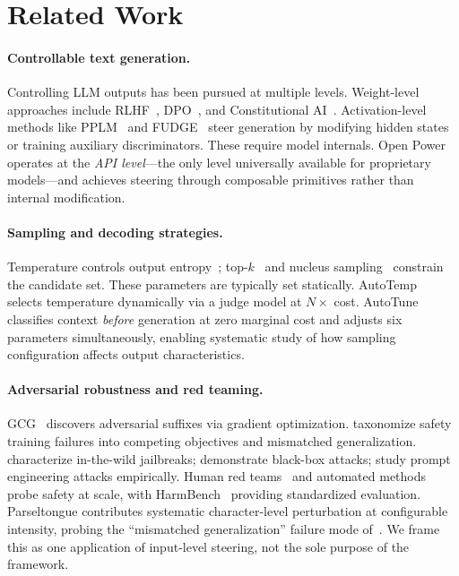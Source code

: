 \documentclass[11pt]{article}
\begin{document}
\section{Related Work}

\paragraph{Controllable text generation.}
Controlling LLM outputs has been pursued at multiple levels. Weight-level approaches include RLHF~\cite{ouyang2022training,stiennon2020learning}, DPO~\cite{rafailov2023direct}, and Constitutional AI~\cite{bai2022constitutional}. Activation-level methods like PPLM~\cite{dathathri2020plug} and FUDGE~\cite{yang2021fudge} steer generation by modifying hidden states or training auxiliary discriminators. These require model internals. Open Power operates at the \emph{API level}---the only level universally available for proprietary models---and achieves steering through composable primitives rather than internal modification.

\paragraph{Sampling and decoding strategies.}
Temperature controls output entropy~\cite{ackley1985learning}; top-$k$~\cite{fan2018hierarchical} and nucleus sampling~\cite{holtzman2020curious} constrain the candidate set. These parameters are typically set statically. AutoTemp~\cite{plinius2024autotemp} selects temperature dynamically via a judge model at $N\times$ cost. AutoTune classifies context \emph{before} generation at zero marginal cost and adjusts six parameters simultaneously, enabling systematic study of how sampling configuration affects output characteristics.

\paragraph{Adversarial robustness and red teaming.}
GCG~\cite{zou2023universal} discovers adversarial suffixes via gradient optimization. \citet{wei2023jailbroken} taxonomize safety training failures into competing objectives and mismatched generalization. \citet{shen2024anything} characterize in-the-wild jailbreaks; \citet{chao2023jailbreaking} demonstrate black-box attacks; \citet{liu2024jailbreaking} study prompt engineering attacks empirically. Human red teams~\cite{ganguli2022red} and automated methods~\cite{perez2022red} probe safety at scale, with HarmBench~\cite{mazeika2024harmbench} providing standardized evaluation. Parseltongue contributes systematic character-level perturbation at configurable intensity, probing the ``mismatched generalization'' failure mode of~\citet{wei2023jailbroken}. We frame this as one application of input-level steering, not the sole purpose of the framework.
\end{document}
